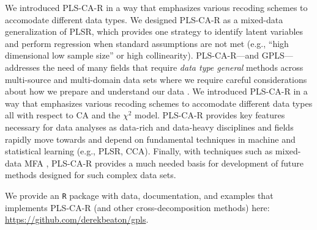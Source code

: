 \documentclass[12pt]{article}
\begin{document}
We introduced PLS-CA-R in a way that emphasizes various recoding schemes
to accomodate different data types. We designed PLS-CA-R as a mixed-data
generalization of PLSR, which provides one strategy to identify latent
variables and perform regression when standard assumptions are not met
(e.g., ``high dimensional low sample size'' or high collinearity).
PLS-CA-R---and GPLS---addresses the need of many fields that require
\textit{data type general} methods across multi-source and multi-domain
data sets where we require careful considerations about how we prepare
and understand our data \citep{nguyen2019ten}. We introduced PLS-CA-R in
a way that emphasizes various recoding schemes to accomodate different
data types all with respect to CA and the \(\chi^2\) model. PLS-CA-R
provides key features necessary for data analyses as data-rich and
data-heavy disciplines and fields rapidly move towards and depend on
fundamental techniques in machine and statistical learning (e.g., PLSR,
CCA). Finally, with techniques such as mixed-data MFA
\citep{becue-bertaut_multiple_2008}, PLS-CA-R provides a much needed
basis for development of future methods designed for such complex data
sets.

We provide an \texttt{R} package with data, documentation, and examples
that implements PLS-CA-R (and other cross-decomposition methods) here:
\url{https://github.com/derekbeaton/gpls}.



\end{document}
